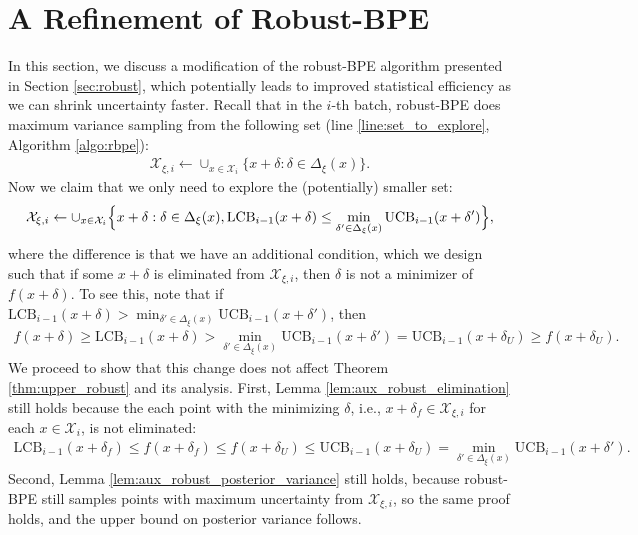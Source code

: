 \documentclass[10pt]{article}
\begin{document}
\section{A Refinement of Robust-BPE}
\label{app:simplify_robust_bpe}
In this section, we discuss a modification of the robust-BPE algorithm presented in Section \ref{sec:robust}, which potentially leads to improved statistical efficiency as we can shrink uncertainty faster.
Recall that in the $i$-th batch, robust-BPE does maximum variance sampling from the following set (line \ref{line:set_to_explore}, Algorithm \ref{algo:rbpe}):
\begin{align}
    \mathcal{X}_{\xi, i}\gets \cup_{x\in\mathcal{X}_i}\{x+\delta:\delta\in\Delta_{\xi}(x)\}.
\end{align}
Now we claim that we only need to explore the (potentially) smaller set:
\begin{align}
    \mathcal{X}_{\xi, i}\gets \cup_{x\in\mathcal{X}_i} \Bigl\{x+\delta:\delta\in\Delta_{\xi}(x), \mathrm{LCB}_{i-1}(x+\delta) \leq \min_{\delta'\in \Delta_{\xi}(x)}\mathrm{UCB}_{i-1}(x+\delta') \Bigr\},
\end{align}
where the difference is that we have an additional condition, which we design such that if some $x+\delta$ is eliminated from $\mathcal{X}_{\xi, i}$, then $\delta$ is not a minimizer of $f(x+\delta)$. 
To see this, note that if $\mathrm{LCB}_{i-1}(x+\delta) > \min_{\delta'\in \Delta_{\xi}(x)}\mathrm{UCB}_{i-1}(x+\delta')$, then 
\begin{align}
    f(x+\delta)
    \geq \mathrm{LCB}_{i-1}(x+\delta) 
    > \min_{\delta'\in \Delta_{\xi}(x)} \mathrm{UCB}_{i-1}(x+\delta')
    = \mathrm{UCB}_{i-1}(x+\delta_U)
    \geq f(x+\delta_U).
\end{align}
We proceed to show that this change does not affect Theorem \ref{thm:upper_robust} and its analysis.
First, Lemma \ref{lem:aux_robust_elimination} still holds because the each point with the minimizing $\delta$, i.e., $x+\delta_f\in \mathcal{X}_{\xi, i}$ for each $x\in \mathcal{X}_i$, is not eliminated:
\begin{align}
    \mathrm{LCB}_{i-1}(x+\delta_f)
    \leq f(x+\delta_f)
    \leq f(x+\delta_U)
    \leq \mathrm{UCB}_{i-1}(x+\delta_U)
    = \min_{\delta'\in \Delta_{\xi}(x)}\mathrm{UCB}_{i-1}(x+\delta').
\end{align}
Second, Lemma \ref{lem:aux_robust_posterior_variance} still holds, 
because robust-BPE still samples points with maximum uncertainty from $\mathcal{X}_{\xi,i}$, so the same proof holds, and the upper bound on posterior variance follows.
\end{document}
